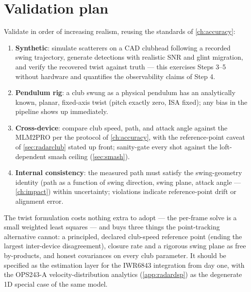\section{Validation plan}
\label{sec:screw-validation}

Validate in order of increasing realism, reusing the standards of \cref{ch:accuracy}:
\begin{enumerate}
\item \textbf{Synthetic}: simulate scatterers on a CAD clubhead following a recorded swing trajectory, generate detections with realistic SNR and glint migration, and verify the recovered twist against truth --- this exercises Steps 3--5 without hardware and quantifies the observability claims of Step 4.
\item \textbf{Pendulum rig}: a club swung as a physical pendulum has an analytically known, planar, fixed-axis twist (pitch exactly zero, ISA fixed); any bias in the pipeline shows up immediately.
\item \textbf{Cross-device}: compare club speed, path, and attack angle against the MLM2PRO per the protocol of \cref{ch:accuracy}, with the reference-point caveat of \cref{sec:radarclub} stated up front; sanity-gate every shot against the loft-dependent smash ceiling (\cref{sec:smash}).
\item \textbf{Internal consistency}: the measured path must satisfy the swing-geometry identity (path as a function of swing direction, swing plane, attack angle --- \cref{ch:impact}) within uncertainty; violations indicate reference-point drift or alignment error.
\end{enumerate}

\begin{implication}
The twist formulation costs nothing extra to adopt --- the per-frame solve is a small weighted least squares --- and buys three things the point-tracking alternative cannot: a principled, declared club-speed reference point (ending the largest inter-device disagreement), closure rate and a rigorous swing plane as free by-products, and honest covariances on every club parameter.
It should be specified as the estimation layer for the IWR6843 integration from day one, with the OPS243-A velocity-distribution analytics (\cref{app:radardsp}) as the degenerate 1D special case of the same model.
\end{implication}

